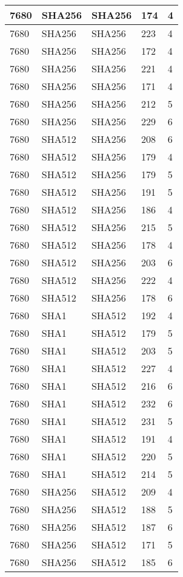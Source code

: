 \begin{tabular}{| l | l | l | l | l |}
7680 & SHA256 & SHA256 & 174 & 4 \\ \hline 
7680 & SHA256 & SHA256 & 223 & 4 \\ \hline 
7680 & SHA256 & SHA256 & 172 & 4 \\ \hline 
7680 & SHA256 & SHA256 & 221 & 4 \\ \hline 
7680 & SHA256 & SHA256 & 171 & 4 \\ \hline 
7680 & SHA256 & SHA256 & 212 & 5 \\ \hline 
7680 & SHA256 & SHA256 & 229 & 6 \\ \hline 
7680 & SHA512 & SHA256 & 208 & 6 \\ \hline 
7680 & SHA512 & SHA256 & 179 & 4 \\ \hline 
7680 & SHA512 & SHA256 & 179 & 5 \\ \hline 
7680 & SHA512 & SHA256 & 191 & 5 \\ \hline 
7680 & SHA512 & SHA256 & 186 & 4 \\ \hline 
7680 & SHA512 & SHA256 & 215 & 5 \\ \hline 
7680 & SHA512 & SHA256 & 178 & 4 \\ \hline 
7680 & SHA512 & SHA256 & 203 & 6 \\ \hline 
7680 & SHA512 & SHA256 & 222 & 4 \\ \hline 
7680 & SHA512 & SHA256 & 178 & 6 \\ \hline 
7680 & SHA1 & SHA512 & 192 & 4 \\ \hline 
7680 & SHA1 & SHA512 & 179 & 5 \\ \hline 
7680 & SHA1 & SHA512 & 203 & 5 \\ \hline 
7680 & SHA1 & SHA512 & 227 & 4 \\ \hline 
7680 & SHA1 & SHA512 & 216 & 6 \\ \hline 
7680 & SHA1 & SHA512 & 232 & 6 \\ \hline 
7680 & SHA1 & SHA512 & 231 & 5 \\ \hline 
7680 & SHA1 & SHA512 & 191 & 4 \\ \hline 
7680 & SHA1 & SHA512 & 220 & 5 \\ \hline 
7680 & SHA1 & SHA512 & 214 & 5 \\ \hline 
7680 & SHA256 & SHA512 & 209 & 4 \\ \hline 
7680 & SHA256 & SHA512 & 188 & 5 \\ \hline 
7680 & SHA256 & SHA512 & 187 & 6 \\ \hline 
7680 & SHA256 & SHA512 & 171 & 5 \\ \hline 
7680 & SHA256 & SHA512 & 185 & 6 \\ \hline 

\end{tabular}
